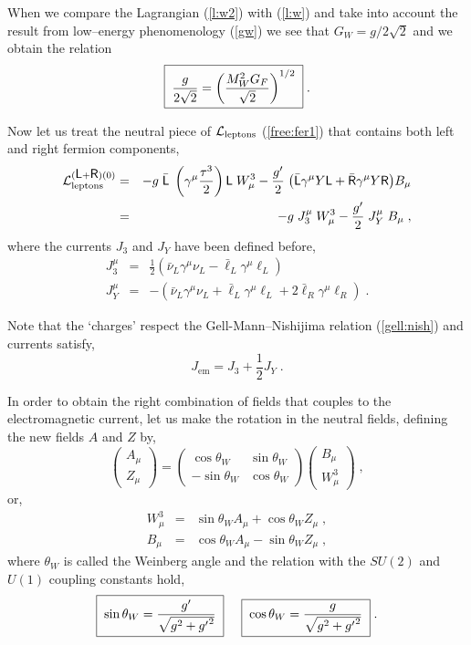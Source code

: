\documentclass[12pt]{report}
\def\text#1{{\scriptstyle\mathrm{#1}}}
\newcommand{\g}{\gamma}
\newcommand{\ld}{\mbox{\sf L}}
\newcommand{\rs}{\mbox{\sf R}}
\newcommand{\lag}{{\cal L}}
\newcommand{\ba}{\begin{array}}
\newcommand{\ea}{\end{array}}
\begin{document}
When we compare the Lagrangian (\ref{l:w2}) with (\ref{l:w}) and take
into account the result from low--energy phenomenology (\ref{gw}) 
we see that $G_W = g/2\sqrt{2}$ and we obtain the
relation 
\begin{equation}
\fbox{$ \; \displaystyle{\frac{g}{2\sqrt{2}} = 
\left(\frac{M_W^2 G_F}{\sqrt{2}} \right)^{1/2}} \; $} \; .
\label{g:rel}
\end{equation}


Now let us treat the neutral piece of
$\lag_{\text{leptons}}$ (\ref{free:fer1}) that contains both left and
right fermion components,
\begin{eqnarray}
\lag_{\text{leptons}}^{(\ld + \rs) (0)} &=& 
- g \; { \bar{\ld} \; \left( \g^\mu \frac{\tau^3}{2} \right)
\ld} \; W^3_\mu
- \frac{g'}{2} \; { \left( \bar{\ld} \g^\mu Y \ld  + 
                      \bar{\rs} \g^\mu Y \rs \right) } B_\mu 
                      \nonumber \\
&=& - g \; { J_3^\mu} \; W^3_\mu - 
\frac{g'}{2} \; { J_Y^\mu} \; B_\mu \; ,
\label{l:0}
\end{eqnarray}
where the currents $J_3$ and $J_Y$ have been defined before, 
\begin{eqnarray*}
J_3^\mu &=& \frac{1}{2} (\bar{\nu}_L \g^\mu \nu_L - \bar{\ell}_L \g^\mu \ell_L)
\\
J_Y^\mu &=& - \left(\bar{\nu}_L \g^\mu \nu_L + \bar{\ell}_L \g^\mu \ell_L
+ 2 \bar{\ell}_R \g^\mu \ell_R \right) \; .
\end{eqnarray*}

Note that the `charges' respect the Gell-Mann--Nishijima relation
(\ref{gell:nish}) and currents satisfy,
\[
J_{\text{em}} = J_3 + \frac{1}{2} J_Y  \; .
\]

In order to obtain the right combination of fields that couples to the
electromagnetic current, let us make the rotation in the neutral
fields, defining the new fields $A$ and $Z$ by,
\begin{equation}
\left( \ba{c}
{ A_\mu} \\
{ Z_\mu}
\ea \right) =
\left( \ba{cc}
\cos \theta_W & \sin\theta_W \\
-\sin\theta_W & \cos \theta_W
\ea \right) 
\left( \ba{c}
B_\mu   \\
W^3_\mu
\ea \right) \; ,
\label{az}
\end{equation}
or,
\begin{eqnarray*}
W^3_\mu &=& \sin\theta_W A_\mu + \cos \theta_W Z_\mu \; , \\
B_\mu   &=& \cos \theta_W A_\mu - \sin\theta_W Z_\mu  \; , 
\end{eqnarray*}
where $\theta_W$ is called the Weinberg angle and the relation with
the $SU(2)$ and $U(1)$ coupling constants hold,
\begin{equation}
\fbox{$ \; \displaystyle{\sin\theta_W = 
\frac{g'}{\sqrt{g^2 + {g'}^2}}} \; $} \;\;\;\;\;
\fbox{$ \; \displaystyle{\cos\theta_W = 
\frac{g}{\sqrt{g^2 + {g'}^2}}}  \; $} \; .
\label{theta}
\end{equation}
\end{document}
